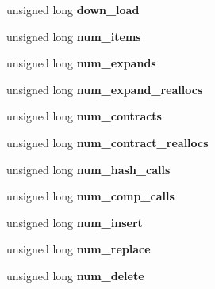 \begin{DoxyCompactItemize}
\item 
\hypertarget{structlhash__st_a7b387c1c46e865aabcad17874e18c937}{}unsigned long {\bfseries down\+\_\+load}\label{structlhash__st_a7b387c1c46e865aabcad17874e18c937}

\item 
\hypertarget{structlhash__st_a5dcb1f2e463252e086032973b31f2078}{}unsigned long {\bfseries num\+\_\+items}\label{structlhash__st_a5dcb1f2e463252e086032973b31f2078}

\item 
\hypertarget{structlhash__st_a19ba871b9f5da314b44adf17546db905}{}unsigned long {\bfseries num\+\_\+expands}\label{structlhash__st_a19ba871b9f5da314b44adf17546db905}

\item 
\hypertarget{structlhash__st_aee3cddefee8066c630b4b1b82ca20b58}{}unsigned long {\bfseries num\+\_\+expand\+\_\+reallocs}\label{structlhash__st_aee3cddefee8066c630b4b1b82ca20b58}

\item 
\hypertarget{structlhash__st_a592f4a9b45f36180109df1e6dad0dfc2}{}unsigned long {\bfseries num\+\_\+contracts}\label{structlhash__st_a592f4a9b45f36180109df1e6dad0dfc2}

\item 
\hypertarget{structlhash__st_a0f1b2c724564a9bbc3d5b847dd570215}{}unsigned long {\bfseries num\+\_\+contract\+\_\+reallocs}\label{structlhash__st_a0f1b2c724564a9bbc3d5b847dd570215}

\item 
\hypertarget{structlhash__st_ad268b6d624e386a9cb2d151cf40faee0}{}unsigned long {\bfseries num\+\_\+hash\+\_\+calls}\label{structlhash__st_ad268b6d624e386a9cb2d151cf40faee0}

\item 
\hypertarget{structlhash__st_ae1b31884e484b59f563c6f81a4fa7d8a}{}unsigned long {\bfseries num\+\_\+comp\+\_\+calls}\label{structlhash__st_ae1b31884e484b59f563c6f81a4fa7d8a}

\item 
\hypertarget{structlhash__st_ada8ae86f682c0925b9f2b50975262017}{}unsigned long {\bfseries num\+\_\+insert}\label{structlhash__st_ada8ae86f682c0925b9f2b50975262017}

\item 
\hypertarget{structlhash__st_a6c301e9b9ec8e09f4bb6882d77f1757e}{}unsigned long {\bfseries num\+\_\+replace}\label{structlhash__st_a6c301e9b9ec8e09f4bb6882d77f1757e}

\item 
\hypertarget{structlhash__st_aefe2bc9e1e050fbb114b26c31fca0879}{}unsigned long {\bfseries num\+\_\+delete}\label{structlhash__st_aefe2bc9e1e050fbb114b26c31fca0879}


\end{DoxyCompactItemize}
